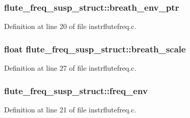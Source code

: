 \subsubsection[{\texorpdfstring{breath\+\_\+env\+\_\+ptr}{breath_env_ptr}}]{ flute\+\_\+freq\+\_\+susp\+\_\+struct\+::breath\+\_\+env\+\_\+ptr}\hypertarget{structflute__freq__susp__struct_ac7020eab2bf35a15b309e40895a38b4c}{}\label{structflute__freq__susp__struct_ac7020eab2bf35a15b309e40895a38b4c}


Definition at line 20 of file instrflutefreq.\+c.

\subsubsection[{\texorpdfstring{breath\+\_\+scale}{breath_scale}}]{\setlength{\rightskip}{0pt plus 5cm}float flute\+\_\+freq\+\_\+susp\+\_\+struct\+::breath\+\_\+scale}\hypertarget{structflute__freq__susp__struct_a4aeb093b436f81a4bcae7954747bda95}{}\label{structflute__freq__susp__struct_a4aeb093b436f81a4bcae7954747bda95}


Definition at line 27 of file instrflutefreq.\+c.

\subsubsection[{\texorpdfstring{freq\+\_\+env}{freq_env}}]{ flute\+\_\+freq\+\_\+susp\+\_\+struct\+::freq\+\_\+env}\hypertarget{structflute__freq__susp__struct_a1fad25ce45fe2841cdbe55acb2ca6572}{}\label{structflute__freq__susp__struct_a1fad25ce45fe2841cdbe55acb2ca6572}


Definition at line 21 of file instrflutefreq.\+c.

